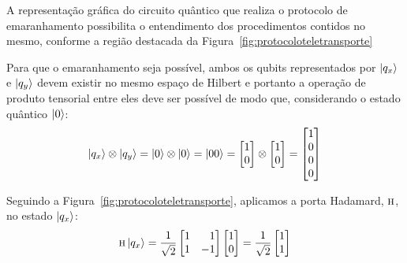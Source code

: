 A representação gráfica do circuito quântico que realiza o protocolo de emaranhamento possibilita o entendimento dos procedimentos contidos no mesmo, conforme a região destacada da Figura~\ref{fig:protocoloteletransporte}

Para que o emaranhamento seja possível, ambos os qubits representados por $\ket{q_x}$ e $\ket{q_y}$ devem existir no mesmo espaço de Hilbert e portanto a operação de produto tensorial entre eles deve ser possível de modo que, considerando o estado quântico $\ket{0}$:
\begin{equation}
\ket{q_x} \otimes \ket{q_y} = \ket{0} \otimes \ket{0} = \ket{00} = \begin{bmatrix}
1 \\
0
\end{bmatrix} \otimes \begin{bmatrix}
1 \\
0
\end{bmatrix} = \begin{bmatrix}
1 \\
0 \\
0 \\
0
\end{bmatrix}
\end{equation}

Seguindo a Figura~\ref{fig:protocoloteletransporte}, aplicamos a porta Hadamard, \(\operatorname{\textsc{h}}\), no estado $\ket{q_x}$:
\begin{equation}\label{eq:Hqbit0}
\HAD \ket{q_x}= \frac{1}{\sqrt{2}} \begin{bmatrix*}[r]
1 & 1 \\
1 & -1
\end{bmatrix*} \begin{bmatrix}
1  \\
0 
\end{bmatrix} = \frac{1}{\sqrt{2}} \begin{bmatrix*}[r]
1 \\
1
\end{bmatrix*}
\end{equation}

